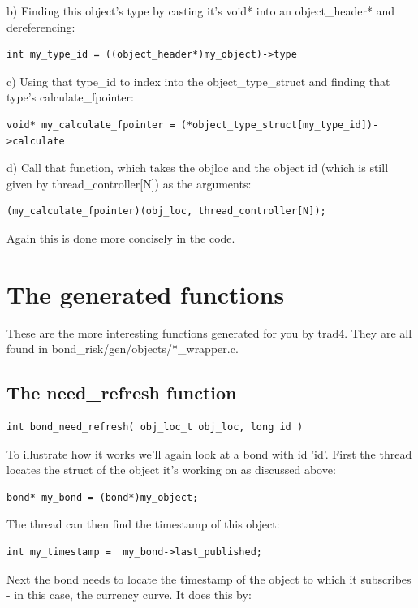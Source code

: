 \documentclass{report}
\begin{document}
b) Finding this object's type by casting it's void* into an object_header* and dereferencing:
\begin{verbatim}
int my_type_id = ((object_header*)my_object)->type  
\end{verbatim}

c) Using that type_id to index into the object_type_struct and finding that type's calculate_fpointer:
\begin{verbatim}
void* my_calculate_fpointer = (*object_type_struct[my_type_id])->calculate
\end{verbatim}

d) Call that function, which takes the objloc and the object id (which is still given by thread_controller[N]) as the arguments:
\begin{verbatim}
(my_calculate_fpointer)(obj_loc, thread_controller[N]);
\end{verbatim}

Again this is done more concisely in the code.

\section{The generated functions}

These are the more interesting functions generated for you by trad4. They are all found in bond_risk/gen/objects/*_wrapper.c.

\subsection{The need_refresh function}

\begin{verbatim}
int bond_need_refresh( obj_loc_t obj_loc, long id )
\end{verbatim}

To illustrate how it works we'll again look at a bond with id 'id'.  First the thread locates the struct of the object it's working on as discussed above:

\begin{verbatim}
bond* my_bond = (bond*)my_object;
\end{verbatim}

The thread can then find the timestamp of this object:
\begin{verbatim}
int my_timestamp =  my_bond->last_published;
\end{verbatim}

Next the bond needs to locate the timestamp of the object to which it subscribes - in this case, the 
currency curve. It does this by:
\end{document}
